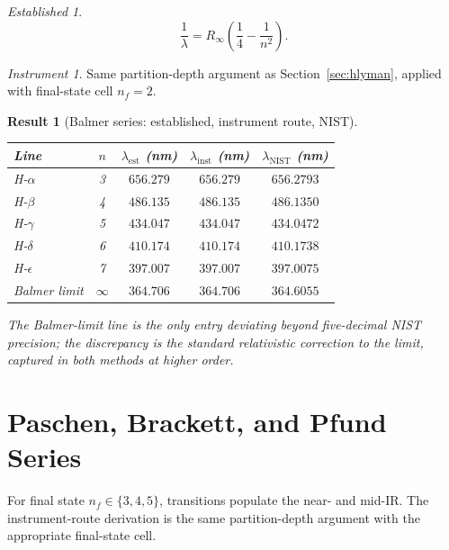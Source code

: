 \documentclass[11pt,a4paper]{article}
\theoremstyle{stmtstyle}
\newtheorem{result}{Result}
\theoremstyle{definition}
\theoremstyle{remark}
\newtheorem*{established}{Established}
\newtheorem*{instrument}{Instrument}
\begin{document}
\begin{established}
\begin{equation}
\frac{1}{\lambda} = R_{\infty}\left(\frac{1}{4} - \frac{1}{n^{2}}\right).
\label{eq:balmerrydberg}
\end{equation}
\end{established}

\begin{instrument}
Same partition-depth argument as Section~\ref{sec:hlyman}, applied with final-state cell $n_{f}=2$.
\end{instrument}

\begin{result}[Balmer series: established, instrument route, NIST]\label{res:balmer}
\begin{center}\small
\begin{tabular}{lcccc}
\toprule
Line & $n$ & $\lambda_{\mathrm{est}}$ (nm) & $\lambda_{\mathrm{inst}}$ (nm) & $\lambda_{\mathrm{NIST}}$ (nm)\\
\midrule
H-$\alpha$ & 3 & $656.279$ & $656.279$ & $656.2793$\\
H-$\beta$  & 4 & $486.135$ & $486.135$ & $486.1350$\\
H-$\gamma$ & 5 & $434.047$ & $434.047$ & $434.0472$\\
H-$\delta$ & 6 & $410.174$ & $410.174$ & $410.1738$\\
H-$\epsilon$ & 7 & $397.007$ & $397.007$ & $397.0075$\\
Balmer limit & $\infty$ & $364.706$ & $364.706$ & $364.6055$\\
\bottomrule
\end{tabular}
\end{center}
The Balmer-limit line is the only entry deviating beyond five-decimal NIST precision; the discrepancy is the standard relativistic correction to the limit, captured in both methods at higher order.
\end{result}

\section{Paschen, Brackett, and Pfund Series}
\label{sec:hpaschen}

For final state $n_{f}\in\{3,4,5\}$, transitions populate the near- and mid-IR. The instrument-route derivation is the same partition-depth argument with the appropriate final-state cell.
\end{document}
